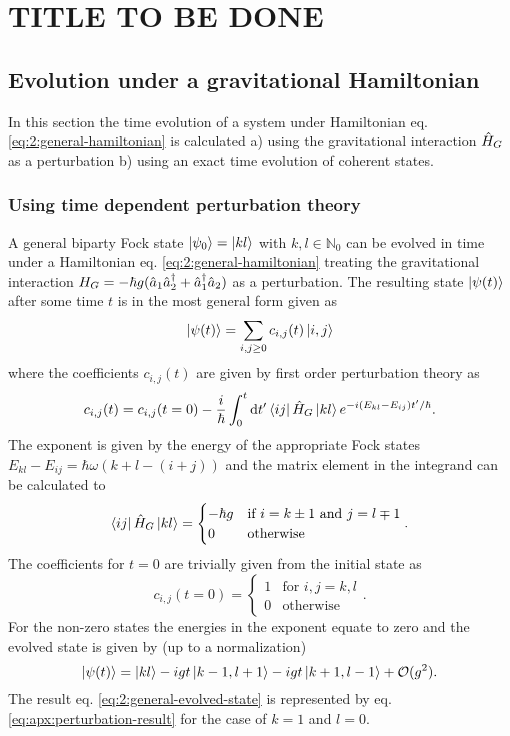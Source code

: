 \chapter{TITLE TO BE DONE}
\section{Evolution under a gravitational Hamiltonian}
In this section the time evolution of a system under Hamiltonian eq. \eqref{eq:2:general-hamiltonian} is calculated a) using the gravitational interaction $\hat{H}_G$ as a perturbation b) using an exact time evolution of coherent states.

\subsection{Using time dependent perturbation theory}
\label{apx:general-state-perturbation-theory}
A general biparty Fock state $\ket{\psi_0} = \ket{kl}$ with $k, l \in \mathbb{N}_0$ can be evolved in time under a Hamiltonian eq. \eqref{eq:2:general-hamiltonian} treating the gravitational interaction $H_G = -\hbar g (\hat{a}_1\hat{a}_2^\dagger + \hat{a}_1^\dagger\hat{a}_2)$ as a perturbation. 
The resulting state $\ket{\psi(t)}$ after some time $t$ is in the most general form given as
\begin{equation}
  \ket{\psi(t)} = \sum_{i, j \geq 0} c_{i,j}(t) \ket{i,j}
\end{equation}
where the coefficients $c_{i,j}(t)$ are given by first order perturbation theory as
\begin{equation}
  c_{i,j}(t) = c_{i,j}(t = 0) - \frac{i}{\hbar} \int_0^t \dd t' \bra{ij}\hat{H}_G\ket{kl} e^{-i(E_{kl}-E_{ij})t'/\hbar} .
\end{equation}
The exponent is given by the energy of the appropriate Fock states $E_{kl}-E_{ij} = \hbar \omega (k+l - (i+j))$ and the matrix element in the integrand can be calculated to
\begin{equation}
  \bra{ij}\hat{H}_G\ket{kl} =
  \begin{cases}
    -\hbar g & \text{if } i = k \pm 1 \text{ and } j = l \mp 1 \\
    0 & \text{otherwise}
  \end{cases}.
\end{equation}
The coefficients for $t=0$ are trivially given from the initial state as
\begin{equation}
  c_{i,j}(t=0) = \begin{cases}
    1 & \text{for } i,j = k,l \\
    0 & \text{otherwise}
  \end{cases}.
\end{equation}
For the non-zero states the energies in the exponent equate to zero and the evolved state is given by (up to a normalization)
\begin{equation}\label{eq:apx:perturbation-result}
  \ket{\psi(t)} = \ket{kl} - i g t \ket{k-1,l+1} - i g t \ket{k+1,l-1} + \mathcal{O}(g^2).
\end{equation}
The result eq. \eqref{eq:2:general-evolved-state} is represented by eq. \eqref{eq:apx:perturbation-result} for the case of $k=1$ and $l=0$.


